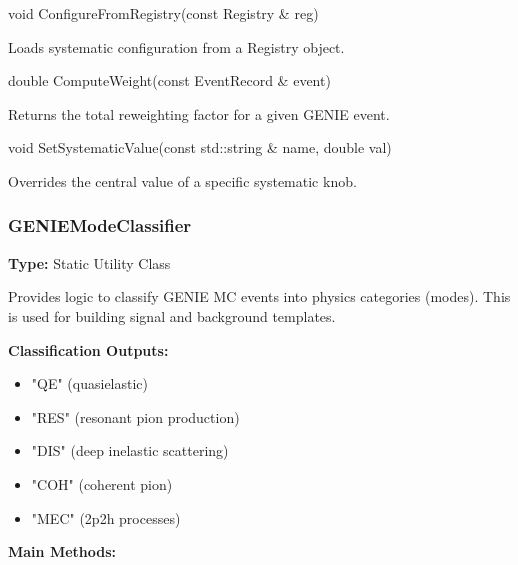 \begin{description}[align=left]

  \item[] {\color{cadmiumred} void ConfigureFromRegistry(const Registry \& reg)}

  Loads systematic configuration from a {\color{cadmiumgreen} Registry} object.

  \item[] {\color{cadmiumred} double ComputeWeight(const EventRecord \& event)}

  Returns the total reweighting factor for a given GENIE event.

  \item[] {\color{cadmiumred} void SetSystematicValue(const std::string \& name, double val)}

  Overrides the central value of a specific systematic knob.

\end{description}

\vspace{1em}
\subsubsection*{\color{cadmiumgreen}\bf GENIEModeClassifier}

\textbf{Type:} Static Utility Class

Provides logic to classify GENIE MC events into physics categories (modes).  
This is used for building signal and background templates.

\vspace{0.5em}
\noindent\textbf{Classification Outputs:}

\begin{itemize}
  \item {\color{amber}"QE"} (quasielastic)
  \item {\color{amber}"RES"} (resonant pion production)
  \item {\color{amber}"DIS"} (deep inelastic scattering)
  \item {\color{amber}"COH"} (coherent pion)
  \item {\color{amber}"MEC"} (2p2h processes)
\end{itemize}

\vspace{0.5em}
\noindent\textbf{Main Methods:}

